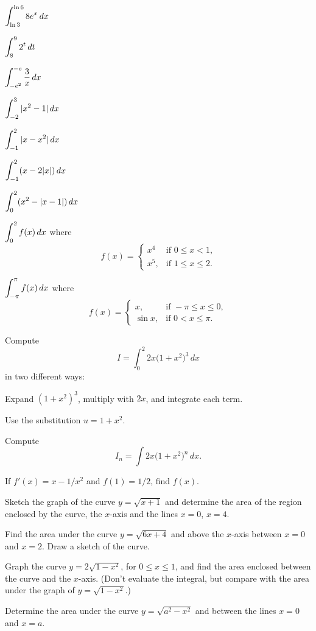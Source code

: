 \begin{multicols}{2}
\problem $\displaystyle \int^{\ln 6}_{\ln 3} 8e^x \,dx$ %

\problem $\displaystyle \int^{9}_{8} 2^t \,dt$ %

\problem $\displaystyle \int^{-e}_{-e^2} \frac{3}{ x} \,dx$ %

\problem $\displaystyle \int^3_{-2} |x^2-1| \,dx$ %

\problem $\displaystyle \int^2_{-1} |x-x^2| \,dx$ %

\problem $\displaystyle \int^2_{-1} (x-2|x|) \,dx$ %

\problem $\displaystyle \int^2_{0} (x^2-|x-1|) \,dx$ %

\problem $\displaystyle \int^2_{0} f(x) \,dx$ where  %
\[
f(x) =
\begin{cases}
  x^4 &\text{if $0\le x<1$,}\\
  x^5,&\text{if $1\le x\le 2$}.
\end{cases}
\]

\problem $\displaystyle \int^\pi_{-\pi} f(x) \,dx$ where %
\[
f(x) =
\begin{cases}
  x, & \text{if }-\pi\le x\le 0,\\
  \sin x, &\text{if }0< x\le \pi.
\end{cases}
\]

\problem Compute %
\[
I = \int _0^2 2x \bigl(1+x^2\bigr)^3\, dx
\]
in two different ways:

\subprob Expand $(1+x^2)^3$, multiply with $2x$, and integrate each term.

\subprob Use the substitution $u=1+x^2$.

\problem Compute %
\[
I_n = \int 2x \bigl(1+x^2\bigr)^n\, dx.
\]

\problem If $f'(x)=x-1/x^2$ and $f(1)=1/2$, find $f(x)$. %

\problem Sketch the graph of the curve $y=\sqrt{x+1}$ and determine the area of %
the region enclosed by the curve, the $x$-axis and the lines $x=0$,
$x=4$.

\problem Find the area under the curve $y=\sqrt{6x+4}$ and above the $x$-axis %
between $x=0$ and $x=2$.  Draw a sketch of the curve.

\problem Graph the curve $y=2\sqrt{1-x^2}$, for $0\leq x \leq 1$, and find the area %
enclosed between the curve and the $x$-axis.  (Don't evaluate the
integral, but compare with the area under the graph of
$y=\sqrt{1-x^2}$.)

\problem Determine the area under the curve $y=\sqrt{a^2-x^2}$ and between the %
lines $x=0$ and $x=a$.


\end{multicols}
